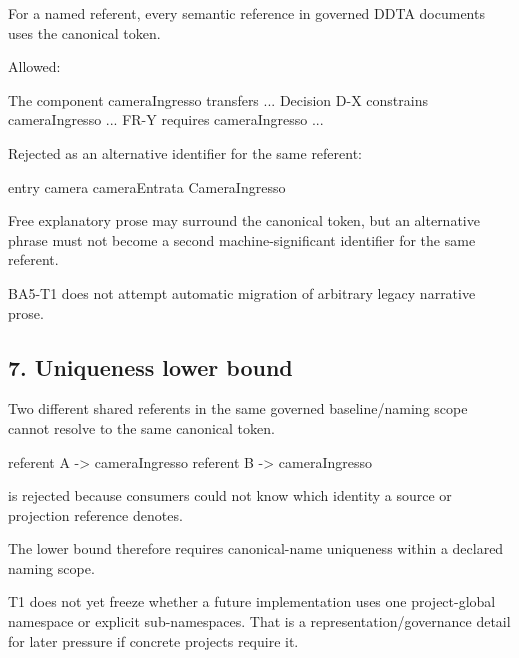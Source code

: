 \documentclass[
  10pt,
  a4paper,
]{article}
\newenvironment{Shaded}{}{}
\newcommand{\NormalTok}[1]{#1}
\begin{document}
For a named referent, every semantic reference in governed DDTA
documents uses the canonical token.

Allowed:

\begin{Shaded}
\begin{Highlighting}[]
\NormalTok{The component \textasciigrave{}cameraIngresso\textasciigrave{} transfers ...}
\NormalTok{Decision D{-}X constrains \textasciigrave{}cameraIngresso\textasciigrave{} ...}
\NormalTok{FR{-}Y requires \textasciigrave{}cameraIngresso\textasciigrave{} ...}
\end{Highlighting}
\end{Shaded}

Rejected as an alternative identifier for the same referent:

\begin{Shaded}
\begin{Highlighting}[]
\NormalTok{entry camera}
\NormalTok{cameraEntrata}
\NormalTok{CameraIngresso}
\end{Highlighting}
\end{Shaded}

Free explanatory prose may surround the canonical token, but an
alternative phrase must not become a second machine-significant
identifier for the same referent.

BA5-T1 does not attempt automatic migration of arbitrary legacy
narrative prose.

\subsection{7. Uniqueness lower bound}\label{uniqueness-lower-bound}

Two different shared referents in the same governed baseline/naming
scope cannot resolve to the same canonical token.

\begin{Shaded}
\begin{Highlighting}[]
\NormalTok{referent A {-}\textgreater{} cameraIngresso}
\NormalTok{referent B {-}\textgreater{} cameraIngresso}
\end{Highlighting}
\end{Shaded}

is rejected because consumers could not know which identity a source or
projection reference denotes.

The lower bound therefore requires canonical-name uniqueness within a
declared naming scope.

T1 does not yet freeze whether a future implementation uses one
project-global namespace or explicit sub-namespaces. That is a
representation/governance detail for later pressure if concrete projects
require it.
\end{document}
